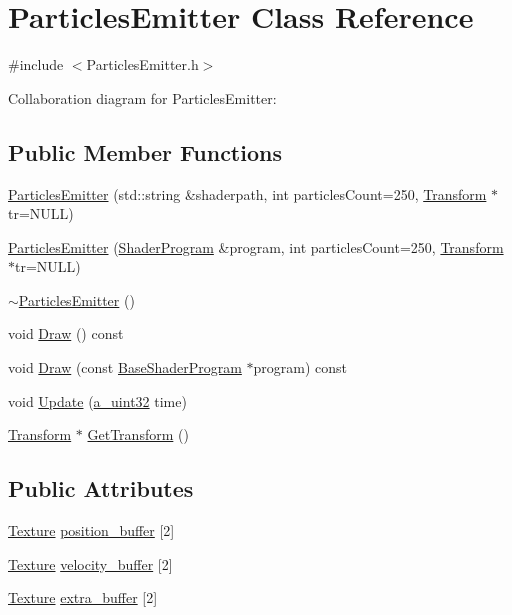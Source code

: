 \hypertarget{class_particles_emitter}{\section{Particles\+Emitter Class Reference}
\label{class_particles_emitter}
}


{\ttfamily \#include $<$Particles\+Emitter.\+h$>$}



Collaboration diagram for Particles\+Emitter\+:
\subsection*{Public Member Functions}
\begin{DoxyCompactItemize}
\item 
\hyperlink{class_particles_emitter_acbf94f018561bb2ff965dca1cf6c1b14}{Particles\+Emitter} (std\+::string \&shaderpath, int particles\+Count=250, \hyperlink{class_agmd_maths_1_1_transform}{Transform} $\ast$tr=N\+U\+L\+L)
\item 
\hyperlink{class_particles_emitter_a7525b09aea03025fb7c1148da750ff68}{Particles\+Emitter} (\hyperlink{class_agmd_1_1_shader_program}{Shader\+Program} \&program, int particles\+Count=250, \hyperlink{class_agmd_maths_1_1_transform}{Transform} $\ast$tr=N\+U\+L\+L)
\item 
\hyperlink{class_particles_emitter_a42bdf88fddda4457168496145cd474b7}{$\sim$\+Particles\+Emitter} ()
\item 
void \hyperlink{class_particles_emitter_ac376a1dcd6bdb9f05021a83c11e3e207}{Draw} () const 
\item 
void \hyperlink{class_particles_emitter_a4779ba9b7cb1d6861ac3538b77a48bc3}{Draw} (const \hyperlink{class_agmd_1_1_base_shader_program}{Base\+Shader\+Program} $\ast$program) const 
\item 
void \hyperlink{class_particles_emitter_a53c719f781fd5778e1982c70b44dc0d5}{Update} (\hyperlink{_common_defines_8h_a964296f9770051b9e4807b1f180dd416}{a\+\_\+uint32} time)
\item 
\hyperlink{class_agmd_maths_1_1_transform}{Transform} $\ast$ \hyperlink{class_particles_emitter_a18a9648cb2a852ccde601908074bc0d8}{Get\+Transform} ()
\end{DoxyCompactItemize}
\subsection*{Public Attributes}
\begin{DoxyCompactItemize}
\item 
\hyperlink{class_agmd_1_1_texture}{Texture} \hyperlink{class_particles_emitter_aaa728ecd42b97efd1e8900518956fd09}{position\+\_\+buffer} \mbox{[}2\mbox{]}
\item 
\hyperlink{class_agmd_1_1_texture}{Texture} \hyperlink{class_particles_emitter_a8f15127a5f7247f56dce194e35154e80}{velocity\+\_\+buffer} \mbox{[}2\mbox{]}
\item 
\hyperlink{class_agmd_1_1_texture}{Texture} \hyperlink{class_particles_emitter_a114fec3226d013ad87726693b3619629}{extra\+\_\+buffer} \mbox{[}2\mbox{]}
\end{DoxyCompactItemize}


